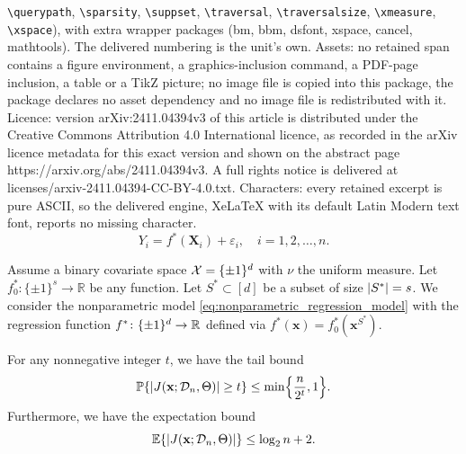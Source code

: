 \documentclass[10pt,a4paper]{amsart}
\DeclarePairedDelimiter{\abs}{|}{|}
\DeclarePairedDelimiter{\braces}{\lbrace}{\rbrace}
\newcommand{\E}{\mathbb{E}}
\newcommand{\R}{\mathbb{R}}
\newcommand{\bX}{\mathbf{X}}
\newcommand{\binspace}{\braces{\pm 1}^\nfeats}
\newcommand{\bx}{\mathbf{x}}
\newcommand{\coordindices}{[\nfeats]}
\newcommand{\data}[1][n]{\mathcal{D}_{#1}}
\newcommand{\nfeats}{d}
\newcommand{\nsamples}{n}
\newcommand{\sparsity}{s}
\newcommand{\suppset}{S^*}
\newcommand{\xmeasure}{\nu}
\renewcommand{\P}{\mathbb{P}}
\renewcommand{\xspace}{\mathcal{X}}
\begin{document}
\texttt{\textbackslash querypath}, \texttt{\textbackslash sparsity}, \texttt{\textbackslash suppset}, \texttt{\textbackslash traversal}, \texttt{\textbackslash traversalsize}, \texttt{\textbackslash xmeasure}, \texttt{\textbackslash xspace}), with extra wrapper packages (bm, bbm, dsfont, xspace, cancel, mathtools). The delivered numbering is the unit's own. Assets: no retained span contains a figure environment, a graphics-inclusion command, a PDF-page inclusion, a table or a TikZ picture; no image file is copied into this package, the package declares no asset dependency and no image file is redistributed with it. Licence: version arXiv:2411.04394v3 of this article is distributed under the Creative Commons Attribution 4.0 International licence, as recorded in the arXiv licence metadata for this exact version and shown on the abstract page https://arxiv.org/abs/2411.04394v3. A full rights notice is delivered at licenses/arxiv-2411.04394-CC-BY-4.0.txt. Characters: every retained excerpt is pure ASCII, so the delivered engine, XeLaTeX with its default Latin Modern text font, reports no missing character.
\begin{equation}
    \label{eq:nonparametric_regression_model}
    Y_i = f^*(\bX_i) + \varepsilon_i, \quad i =1,2,\ldots,\nsamples.
\end{equation}

\begin{assumption}
    \label{assumption}
    Assume a binary covariate space $\xspace = \binspace$ with $\xmeasure$ the uniform measure.
    Let $f^*_0\colon \lbrace\pm 1\rbrace^\sparsity \to \R$ be any function.
    Let $\suppset \subset \coordindices$ be a subset of size $\abs*{\suppset} = \sparsity$.
    We consider the nonparametric model \eqref{eq:nonparametric_regression_model} with the regression function $f^*\colon \binspace \to \R$ defined via $f^*(\bx) = f^*_0(\bx^{\suppset})$.
\end{assumption}

\begin{lemma}
    \label{lem:bound_for_tree_depth}
    For any nonnegative integer $t$, we have the tail bound
    \begin{equation}
    \label{eq:tree_depth_probability}
        \P\braces*{\abs*{J(\bx;\data,\Theta)} \geq t} \leq \min\braces*{\frac{n}{2^{t}},1}.
    \end{equation}
    Furthermore, we have the expectation bound
    \begin{equation}
    \label{eq:tree_depth_expectation}
        \E\braces*{\abs*{J(\bx;\data,\Theta)}} \leq \log_2 \nsamples + 2.
    \end{equation}
\end{lemma}
\end{document}
